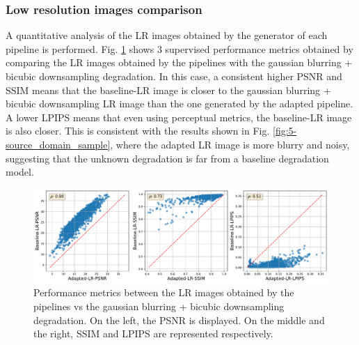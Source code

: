         \subsubsection{Low resolution images comparison}

        A quantitative analysis of the LR images obtained by the generator of each pipeline is performed. 
        Fig. \ref{fig:5-source-domain-lr-performance-scatterplot} shows 3 supervised performance metrics obtained by comparing the LR images obtained by the pipelines with the gaussian blurring + bicubic downsampling degradation.
        In this case, a consistent higher PSNR and SSIM means that the baseline-LR image is closer to the gaussian blurring + bicubic downsampling LR image than the one generated by the adapted pipeline. 
        A lower LPIPS means that even using perceptual metrics, the baseline-LR image is also closer.
        This is consistent with the results shown in Fig. \ref{fig:5-source_domain_sample}, where the adapted LR image is more blurry and noisy, suggesting that the unknown degradation is far from a baseline degradation model.
        
        \begin{figure}[H]
            \centering
            \includegraphics[width=\textwidth]{Includes/5-source-domain-lr-performance-scatterplot.pdf}
            \caption{Performance metrics between the LR images obtained by the pipelines vs the gaussian blurring + bicubic downsampling degradation.
                     On the left, the PSNR is displayed. On the middle and the right, SSIM and LPIPS are represented respectively.}
            \label{fig:5-source-domain-lr-performance-scatterplot}
        \end{figure}




